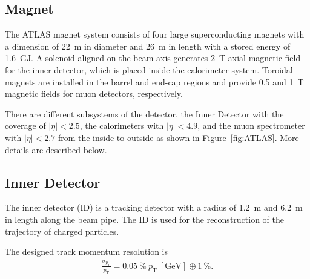 \subsection{Magnet}
The ATLAS magnet system consists of four large superconducting magnets with a dimension of 22~m in diameter and 26~m in length with a stored energy of 1.6~GJ. A solenoid aligned on the beam axis generates 2~T axial magnetic field for the inner detector, which is placed inside the calorimeter system. 
Toroidal magnets are installed in the barrel and end-cap regions and provide 0.5 and 1~T magnetic fields for muon detectors, respectively.



There are different subsystems of the detector, the Inner Detector with the coverage of $| \eta | < 2.5$, the calorimeters with $| \eta | < 4.9$, and  the muon spectrometer with $| \eta | < 2.7$ from the inside to outside as shown in Figure~\ref{fig:ATLAS}. 
More details are described below.

\subsection{Inner Detector}
The inner detector (ID) is a tracking detector with a radius of 1.2~m and 6.2~m in length along the beam pipe. 
The ID is used for the reconstruction of the trajectory of charged particles. 

The designed track momentum resolution is
\begin{eqnarray*}
    \frac{\sigma_{p_{\mathrm{T}}}}{p_{\mathrm{T}}} = 0.05~\% ~p_{\mathrm{T}}~[\mathrm{GeV}] \oplus 1~\%.
\end{eqnarray*}

